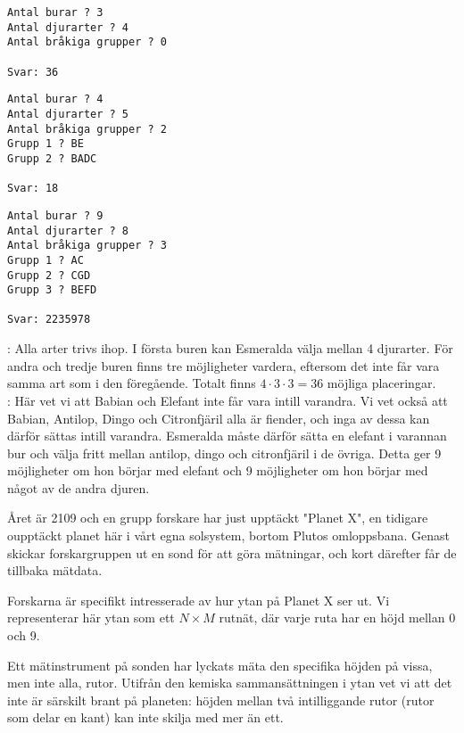 \begin{multicols}{2}

\begin{verbatim}
Antal burar ? 3
Antal djurarter ? 4
Antal bråkiga grupper ? 0

Svar: 36
\end{verbatim}

\begin{verbatim}
Antal burar ? 4
Antal djurarter ? 5
Antal bråkiga grupper ? 2
Grupp 1 ? BE
Grupp 2 ? BADC

Svar: 18
\end{verbatim}

\begin{verbatim}
Antal burar ? 9
Antal djurarter ? 8
Antal bråkiga grupper ? 3
Grupp 1 ? AC
Grupp 2 ? CGD
Grupp 3 ? BEFD 

Svar: 2235978
\end{verbatim}

\vfill\columnbreak
{}: Alla arter trivs ihop. I första buren kan Esmeralda välja mellan 4 djurarter. För andra och tredje buren finns tre möjligheter vardera, eftersom det inte får vara samma art som i den föregående. Totalt finns $4\cdot 3\cdot 3=36$ möjliga placeringar.\\

: Här vet vi att Babian och Elefant inte får vara intill varandra. Vi vet också att Babian, Antilop, Dingo och Citronfjäril alla är fiender, och inga av dessa kan därför sättas intill varandra. Esmeralda måste därför sätta en elefant i varannan bur och välja fritt mellan antilop, dingo och citronfjäril i de övriga. Detta ger 9 möjligheter om hon börjar med elefant och 9 möjligheter om hon börjar med något av de andra djuren.

\end{multicols}

\newpage
{}

Året är 2109 och en grupp forskare har just upptäckt "Planet X", 
en tidigare oupptäckt planet här i vårt egna solsystem,
bortom Plutos omloppsbana. Genast skickar forskargruppen ut
en sond för att göra mätningar, och kort därefter får de tillbaka mätdata.

Forskarna är specifikt intresserade av hur ytan på Planet X ser ut.
Vi representerar här ytan som ett $N \times M$ rutnät, där varje ruta
har en höjd mellan 0 och 9.

Ett mätinstrument på sonden har lyckats mäta den specifika höjden
på vissa, men inte alla, rutor. Utifrån den kemiska sammansättningen i ytan vet vi att det inte 
är särskilt brant på planeten: höjden mellan två
intilliggande rutor (rutor som delar en kant) kan inte skilja 
med mer än ett. 

